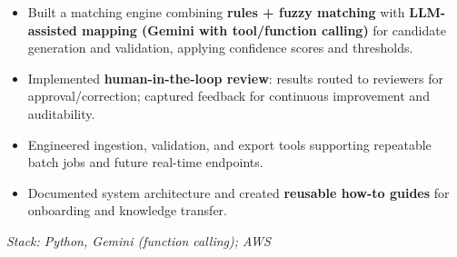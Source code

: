 \documentclass[10pt,a4paper]{altacv}
\begin{document}
\divider

\begin{itemize}
  \item Built a matching engine combining \textbf{rules + fuzzy matching} with \textbf{LLM-assisted mapping (Gemini with tool/function calling)} for candidate generation and validation, applying confidence scores and thresholds.
  \item Implemented \textbf{human-in-the-loop review}: results routed to reviewers for approval/correction; captured feedback for continuous improvement and auditability.
  \item Engineered ingestion, validation, and export tools supporting repeatable batch jobs and future real-time endpoints.
  \item Documented system architecture and created \textbf{reusable how-to guides} for onboarding and knowledge transfer.
\end{itemize}
\textit{Stack: Python, Gemini (function calling); AWS}

\divider

\end{document}

